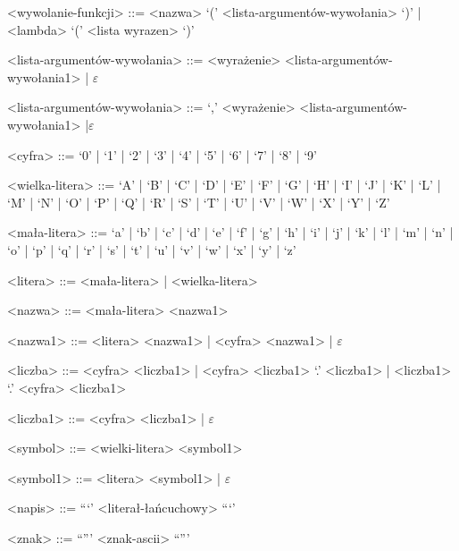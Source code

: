 \documentclass[4paper,10pt]{article}
\begin{document}
\begin{grammar}
\vskip 0.5cm

<wywolanie-funkcji>                ::= <nazwa> `(' <lista-argumentów-wywołania> `)' | <lambda> `(' <lista wyrazen> `)'

<lista-argumentów-wywołania>       ::= <wyrażenie> <lista-argumentów-wywołania1> | $\varepsilon$

<lista-argumentów-wywołania>       ::= `,' <wyrażenie> <lista-argumentów-wywołania1> |$\varepsilon$

\vskip 0.5cm

<cyfra>         ::= `0' | `1' | `2' | `3' | `4' | `5' | `6' | `7' | `8' | `9'

<wielka-litera>   ::= `A' | `B' | `C' | `D' | `E' | `F' | `G' | `H' | `I' | `J' | `K' | `L' | `M' | `N' | `O' | `P' | `Q' | `R' | `S' | `T' | `U' | `V' | `W' | `X' | `Y' | `Z'

<mała-litera>     ::= `a' | `b' | `c' | `d' | `e' | `f' | `g' | `h' | `i' | `j' | `k' | `l' | `m' | `n' | `o' | `p' | `q' | `r' | `s' | `t' | `u' | `v' | `w' | `x' | `y' | `z'

\vskip 0.5cm

<litera>          ::= <mała-litera> | <wielka-litera>

<nazwa>         ::= <mała-litera> <nazwa1>

<nazwa1>        ::= <litera> <nazwa1> | <cyfra> <nazwa1> | $\varepsilon$

<liczba>        ::= <cyfra> <liczba1> | <cyfra> <liczba1> `.' <liczba1> | <liczba1> `.' <cyfra> <liczba1>

<liczba1>       ::= <cyfra> <liczba1> | $\varepsilon$

<symbol>        ::= <wielki-litera> <symbol1>

<symbol1>       ::= <litera> <symbol1> | $\varepsilon$

<napis>         ::= ```' <literał-łańcuchowy> ```'

<znak>			::= ``''' <znak-ascii> ``'''

\end{grammar}
\end{document}
